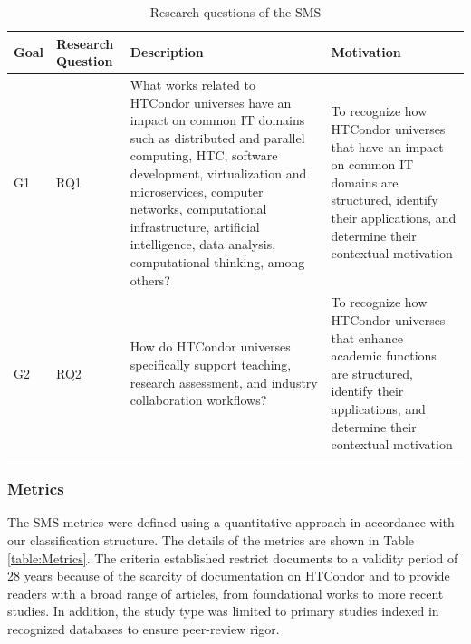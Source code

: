 \begin{table}[ht]
\renewcommand{\arraystretch}{1.3}
    \centering
	\caption{Research questions of the SMS}
    \begin{tabular}{p{0.7cm}p{1.6cm}p{6.5cm}p{6cm}}
        \hline
        \textbf{Goal} & \textbf{Research Question} & \textbf{Description} & \textbf{Motivation} \\
        \hline
        G1            & RQ1                        & What works related to HTCondor universes have an impact on common IT domains such as distributed and parallel computing, HTC, software development, virtualization and microservices, computer networks, computational infrastructure, artificial intelligence, data analysis, computational thinking, among others? & To recognize how HTCondor universes that have an impact on common IT domains are structured, identify their applications, and determine their contextual motivation \\
        G2            & RQ2                        & How do HTCondor universes specifically support teaching, research assessment, and industry collaboration workflows? & To recognize how HTCondor universes that enhance academic functions are structured, identify their applications, and determine their contextual motivation \\
        \hline
    \end{tabular}
	\label{table:RQs}
\end{table}

\subsubsection{Metrics}
The SMS metrics were defined using a quantitative approach in accordance with our classification structure. The details of the metrics are shown in Table \ref{table:Metrics}. The criteria established restrict documents to a validity period of 28 years because of the scarcity of documentation on HTCondor and to provide readers with a broad range of articles, from foundational works to more recent studies. In addition, the study type was limited to primary studies indexed in recognized databases to ensure peer-review rigor.

